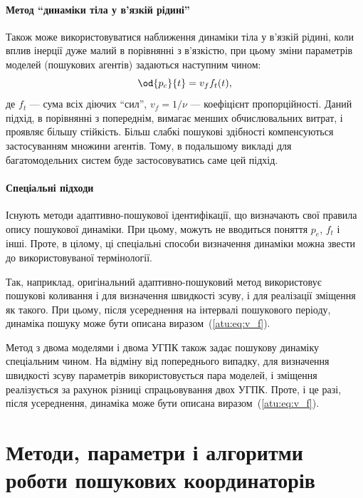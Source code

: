 \paragraph{Метод ``динаміки тіла у в'язкій рідині''}

Також може використовуватися наближення динаміки тіла у в'язкій рідині, коли
вплив інерції дуже малий в порівнянні з в'язкістю, при цьому зміни параметрів
моделей (пошукових агентів) задаються наступним чином:
%
\begin{equation}
  \od{p_c}{t} = v_f f_t(t),
  \label{atu:eq:v_f}
\end{equation}
%
\noindent
де $f_t$ --- сума всіх діючих ``сил'',
$v_f = 1 / \nu$ --- коефіцієнт
пропорційності. Даний підхід, в порівнянні з попереднім, вимагає менших
обчислювальних витрат, і проявляє більшу стійкість. Більш слабкі пошукові
здібності компенсуються застосуванням множини агентів. Тому, в подальшому
викладі для багатомодельних систем буде застосовуватись саме цей підхід.

\paragraph{Спеціальні підходи}

Існують методи адаптивно-пошукової ідентифікації, що визначають
свої правила опису пошукової динаміки. При цьому, можуть не
вводиться поняття
$ p_e $,
$ f_t $ і інші. Проте, в цілому, ці спеціальні способи визначення
динаміки можна звести до використовуваної термінології.

Так, наприклад, оригінальний адаптивно-пошуковий метод
використовує пошукові коливання і для визначення швидкості
зсуву, і для реалізації зміщення як такого. При цьому, після
усереднення на інтервалі пошукового періоду, динаміка пошуку
може бути описана виразом~(\ref{atu:eq:v_f}).

Метод з двома моделями і двома УГПК також задає пошукову
динаміку спеціальним чином. На відміну від попереднього випадку,
для визначення швидкості зсуву параметрів використовується
пара моделей, і зміщення реалізується за рахунок різниці
спрацьовування двох УГПК. Проте, і це разі, після усереднення,
динаміка може бути описана виразом~(\ref{atu:eq:v_f}).








\section{Методи, параметри і алгоритми роботи пошукових координаторів} %

